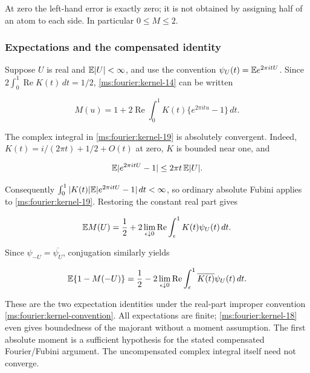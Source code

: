 At zero the left-hand error is exactly zero; it is not obtained by
assigning half of an atom to each side. In particular \(0\le M\le2\).

\subsubsection{Expectations and the compensated identity}

Suppose \(U\) is real and \(\mathbb E|U|<\infty\), and use the convention
\(\psi_U(t)=\mathbb E e^{2\pi itU}\). Since
\(2\int_0^1\operatorname{Re}K(t)\,dt=1/2\), \eqref{ms:fourier:kernel-14} can be written

\begin{equation}
 M(u)=1+2\operatorname{Re}\int_0^1
             K(t)\{e^{2\pi itu}-1\}\,dt.             \label{ms:fourier:kernel-19}
\end{equation}

The complex integral in \eqref{ms:fourier:kernel-19} is absolutely convergent. Indeed,
\(K(t)=i/(2\pi t)+1/2+O(t)\) at zero, \(K\) is bounded near one,
and

\[
 \mathbb E|e^{2\pi itU}-1|\le2\pi t\,\mathbb E|U|.
\]

Consequently
\(\int_0^1|K(t)|\mathbb E|e^{2\pi itU}-1|\,dt<\infty\), so ordinary
absolute Fubini applies to \eqref{ms:fourier:kernel-19}. Restoring the constant real part gives

\begin{equation}
 \mathbb E M(U)=\frac12+
     2\lim_{\epsilon\downarrow0}\operatorname{Re}
        \int_\epsilon^1K(t)\psi_U(t)\,dt.            \label{ms:fourier:kernel-20}
\end{equation}

Since \(\psi_{-U}=\overline{\psi_U}\), conjugation similarly yields

\begin{equation}
 \mathbb E\{1-M(-U)\}=\frac12-
     2\lim_{\epsilon\downarrow0}\operatorname{Re}
        \int_\epsilon^1\overline{K(t)}\psi_U(t)\,dt.
 \label{ms:fourier:kernel-21}
\end{equation}

These are the two expectation identities under the real-part
improper convention \eqref{ms:fourier:kernel-convention}. All expectations are finite; \eqref{ms:fourier:kernel-18} even gives
boundedness of the majorant without a moment assumption. The first
absolute moment is a sufficient hypothesis for the stated compensated
Fourier/Fubini argument. The uncompensated complex integral itself need
not converge.

